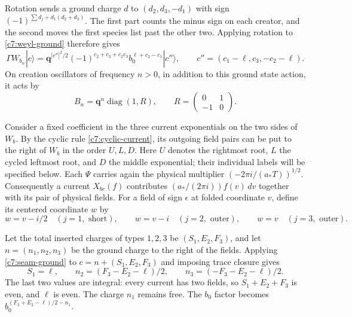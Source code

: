 Rotation sends a ground charge $d$ to $(d_2,d_3,-d_1)$ with sign
$(-1)^{\sum d_j+d_1(d_2+d_3)}$.  The first part counts the minus sign on
each creator, and the second moves the first species list past the other
two.  Applying rotation to \eqref{c7:weyl-ground} therefore gives
\begin{equation}\label{c7:seam-ground}
\Gamma W_{b_w}|c\rangle
=\mathbf q^{|c''|^2/2}(-1)^{c_2+c_3+c_2c_3}
 b_0^{\ell+c_2-c_1}|c''\rangle,
\qquad c''=(c_1-\ell,c_3,-c_2-\ell).
\end{equation}
On creation oscillators of frequency $n>0$, in addition to this ground
state action, it acts by
\begin{equation}\label{c7:oscillator-twist}
B_n=\mathbf q^n\operatorname{diag}(1,R),\qquad
R=\begin{pmatrix}0&1\\-1&0\end{pmatrix}.
\end{equation}

Consider a fixed coefficient in the three current exponentials on the two
sides of $W_b$.  By the cyclic rule \eqref{c7:cyclic-current}, its outgoing
field pairs can be put to the right of $W_b$ in the order $U,L,D$.
Here $U$ denotes the rightmost root, $L$ the cycled leftmost root, and $D$
the middle exponential; their individual labels will be specified below.
Each $\Psi$ carries again the physical multiplier
$(-2\pi i/(a_*T))^{1/2}$.  Consequently a current $X_{bc}(f)$ contributes
$(a_*/(2\pi i))f(v)\,dv$ together with its pair of physical fields.
For a field of sign $\epsilon$ at folded coordinate $v$, define its centered
coordinate $w$ by
\begin{equation}\label{c7:centered-fields}
w=v-i/2\quad(j=1,\text{ short}),\qquad
w=v-i\quad(j=2,\text{ outer}),\qquad
w=v\quad(j=3,\text{ outer}).
\end{equation}

Let the total inserted charges of types $1,2,3$ be $(S_1,E_2,F_3)$, and let
$n=(n_1,n_2,n_3)$ be the ground charge to the right of the fields.  Applying
\eqref{c7:seam-ground} to $c=n+(S_1,E_2,F_3)$ and imposing trace closure
gives
\begin{equation}\label{c7:charge-closure}
S_1=\ell,\qquad
n_2=(F_3-E_2-\ell)/2,\qquad
n_3=(-F_3-E_2-\ell)/2.
\end{equation}
The last two values are integral: every current has two fields, so
$S_1+E_2+F_3$ is even, and $\ell$ is even.  The charge $n_1$ remains free.
The $b_0$ factor becomes $b_0^{(F_3+E_2-\ell)/2-n_1}$.

